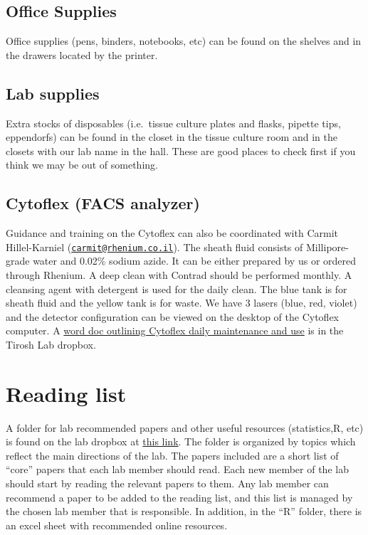 \documentclass[
]{book}
\begin{document}
\hypertarget{office-supplies-1}{%
\section{Office Supplies}\label{office-supplies-1}}

Office supplies (pens, binders, notebooks, etc) can be found on the shelves and in the drawers located by the printer.

\hypertarget{lab-supplies}{%
\section{Lab supplies}\label{lab-supplies}}

Extra stocks of disposables (i.e.~tissue culture plates and flasks, pipette tips, eppendorfs) can be found in the closet in the tissue culture room and in the closets with our lab name in the hall. These are good places to check first if you think we may be out of something.

\hypertarget{cytoflex-facs-analyzer}{%
\section{Cytoflex (FACS analyzer)}\label{cytoflex-facs-analyzer}}

Guidance and training on the Cytoflex can also be coordinated with Carmit Hillel-Karniel (\href{mailto:carmit@rhenium.co.il}{\nolinkurl{carmit@rhenium.co.il}}). The sheath fluid consists of Millipore-grade water and 0.02\% sodium azide. It can be either prepared by us or ordered through Rhenium. A deep clean with Contrad should be performed monthly. A cleansing agent with detergent is used for the daily clean. The blue tank is for sheath fluid and the yellow tank is for waste. We have 3 lasers (blue, red, violet) and the detector configuration can be viewed on the desktop of the Cytoflex computer. A \href{https://www.dropbox.com/s/ckvy0vshi45e95r/LSR\%20II\%20Quick\%20Reference.docx?dl=0}{word doc outlining Cytoflex daily maintenance and use} is in the Tirosh Lab dropbox.

\hypertarget{readingList}{%
\chapter{Reading list}\label{readingList}}

A folder for lab recommended papers and other useful resources (statistics,R, etc) is found on the lab dropbox at \href{https://www.dropbox.com/sh/52ybes4a40ypn0q/AAAL2FlVKqRJw-Z4ScuWTW7Ra?dl=0}{this link}.
The folder is organized by topics which reflect the main directions of the lab. The papers included are a short list of ``core'' papers that each lab member should read. Each new member of the lab should start by reading the relevant papers to them. Any lab member can recommend a paper to be added to the reading list, and this list is managed by the chosen lab member that is responsible. In addition, in the ``R'' folder, there is an excel sheet with recommended online resources.
\end{document}
